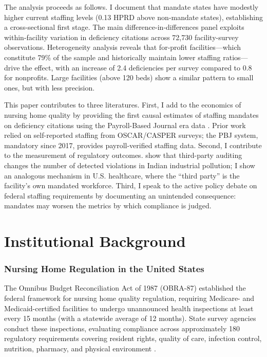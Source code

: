 \documentclass[12pt]{article}
\begin{document}
The analysis proceeds as follows. I document that mandate states have modestly higher current staffing levels (0.13 HPRD above non-mandate states), establishing a cross-sectional first stage. The main difference-in-differences panel exploits within-facility variation in deficiency citations across 72,730 facility-survey observations. Heterogeneity analysis reveals that for-profit facilities---which constitute 79\% of the sample and historically maintain lower staffing ratios---drive the effect, with an increase of 2.4 deficiencies per survey compared to 0.8 for nonprofits. Large facilities (above 120 beds) show a similar pattern to small ones, but with less precision.

This paper contributes to three literatures. First, I add to the economics of nursing home quality by providing the first causal estimates of staffing mandates on deficiency citations using the Payroll-Based Journal era data \citep{bowblis2011, matsudaira2014, lin2014}. Prior work relied on self-reported staffing from OSCAR/CASPER surveys; the PBJ system, mandatory since 2017, provides payroll-verified staffing data. Second, I contribute to the measurement of regulatory outcomes. \citet{duflo2013} show that third-party auditing changes the number of detected violations in Indian industrial pollution; I show an analogous mechanism in U.S. healthcare, where the ``third party'' is the facility's own mandated workforce. Third, I speak to the active policy debate on federal staffing requirements by documenting an unintended consequence: mandates may worsen the metrics by which compliance is judged.

\section{Institutional Background}

\subsubsection*{Nursing Home Regulation in the United States} The Omnibus Budget Reconciliation Act of 1987 (OBRA-87) established the federal framework for nursing home quality regulation, requiring Medicare- and Medicaid-certified facilities to undergo unannounced health inspections at least every 15 months (with a statewide average of 12 months). State survey agencies conduct these inspections, evaluating compliance across approximately 180 regulatory requirements covering resident rights, quality of care, infection control, nutrition, pharmacy, and physical environment \citep{harrington2004}.
\end{document}
